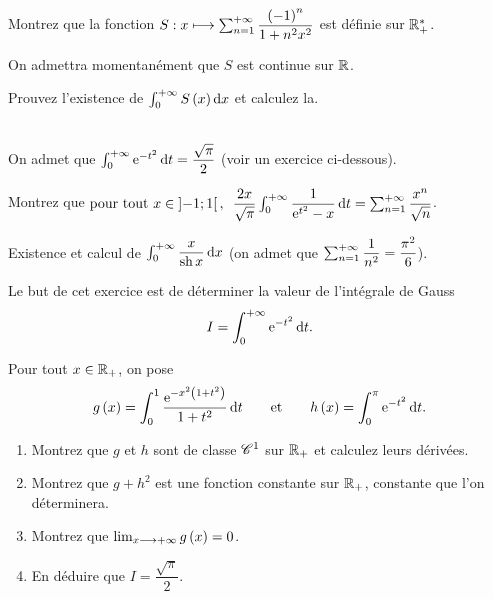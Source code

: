 \begin{exoss}
Montrez que la fonction \(S:x\longmapsto\sum_{n=1}^{+\infty}\dfrac{\left(-1\right)^n}{1+n^2x^2}\) est définie sur \(\mathbb{R}_+^*\).

On admettra momentanément que \(S\) est continue sur \(\mathbb{R}\).

Prouvez l'existence de \(\int_0^{\pinf}S\paren{x}\odif{x}\) et calculez la.
\end{exoss}

\begin{exoss}~\\
On admet que \(\int_0^{\pinf}\e{-t^2}\odif{t}=\dfrac{\sqrt{\pi}}{2}\) (voir un exercice ci-dessous).

Montrez que \(\quantifs{\tpt x\in\intervee{-1}{1}}\dfrac{2x}{\sqrt{\pi}}\int_0^{\pinf}\dfrac{1}{\e{t^2}-x}\odif{t}=\sum_{n=1}^{\pinf}\dfrac{x^n}{\sqrt{n}}\).
\end{exoss}

\begin{exoss}
Existence et calcul de \(\int_0^{\pinf}\dfrac{x}{\sh x}\odif{x}\) (on admet que \(\sum_{n=1}^{+\infty}\dfrac{1}{n^2}=\dfrac{\pi^2}{6}\)).
\end{exoss}

\begin{exoss}
Le but de cet exercice est de déterminer la valeur de l'intégrale de Gauss \[I=\int_0^{\pinf}\e{-t^2}\odif{t}.\]

Pour tout \(x\in\mathbb{R}_+\), on pose \[g\paren{x}=\int_0^1\dfrac{\e{-x^2\paren{1+t^2}}}{1+t^2}\odif{t}\qquad\text{et}\qquad h\paren{x}=\int_0^\pi\e{-t^2}\odif{t}.\]

\begin{enumerate}
    \item Montrez que \(g\) et \(h\) sont de classe \(\mathscr{C}^{1}\) sur \(\mathbb{R}_+\) et calculez leurs dérivées. \\
    \item Montrez que \(g+h^2\) est une fonction constante sur \(\mathbb{R}_+\), constante que l'on déterminera. \\
    \item Montrez que \(\lim_{x\longrightarrow+\infty}g\left(x\right)=0\). \\
    \item En déduire que \(I=\dfrac{\sqrt{\pi}}{2}\).
\end{enumerate}
\end{exoss}

